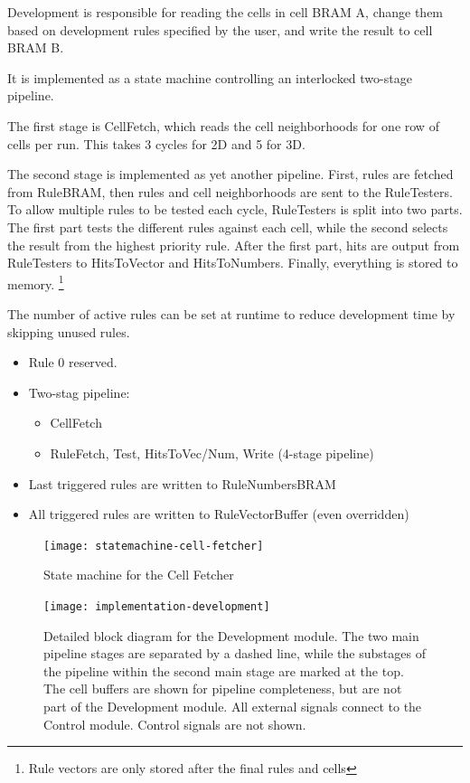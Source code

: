 Development is responsible for reading the cells in cell BRAM A, change them based on development rules specified by the user, and write the result to cell BRAM B.

It is implemented as a state machine controlling an interlocked two-stage pipeline.

The first stage is CellFetch, which reads the cell neighborhoods for one row of cells per run.
This takes 3 cycles for 2D and 5 for 3D.

The second stage is implemented as yet another pipeline.
First, rules are fetched from RuleBRAM, then rules and cell neighborhoods are sent to the RuleTesters.
To allow multiple rules to be tested each cycle, RuleTesters is split into two parts.
The first part tests the different rules against each cell, while the second selects the result from the highest priority rule.
After the first part, hits are output from RuleTesters to HitsToVector and HitsToNumbers.
Finally, everything is stored to memory.
\footnote{Rule vectors are only stored after the final rules and cells}

The number of active rules can be set at runtime to reduce development time by skipping unused rules.
\TODO
{}

\begin{itemize}
    \item Rule 0 reserved.
    \item Two-stag pipeline:
    \begin{itemize}
        \item CellFetch
        \item RuleFetch, Test, HitsToVec/Num, Write (4-stage pipeline)
    \end{itemize}
    \item Last triggered rules are written to RuleNumbersBRAM
    \item All triggered rules are written to RuleVectorBuffer (even overridden)
\end{itemize}

\begin{figure}[!ht]
    \centering
    \texttt{[image: statemachine-cell-fetcher]}
    \caption{State machine for the Cell Fetcher}
    \label{fig:implementation-cell-fetcher}
\end{figure}

\begin{figure}[!ht]
    \centering
    \texttt{[image: implementation-development]}
    \caption{
        Detailed block diagram for the Development module.
        The two main pipeline stages are separated by a dashed line,
        while the substages of the pipeline within the second main stage are marked at the top.
        The cell buffers are shown for pipeline completeness, but are not part of the Development module.
        All external signals connect to the Control module.
        Control signals are not shown.
    }
    \label{fig:implementation-development}
\end{figure}

